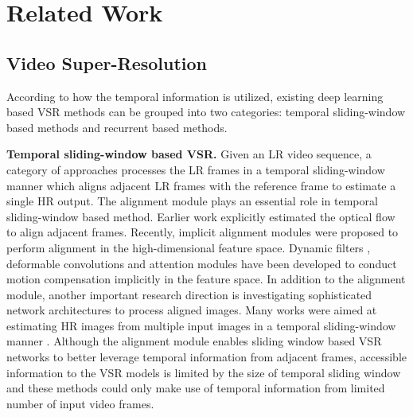\documentclass[10pt,twocolumn,letterpaper]{article}
\begin{document}
\section{Related Work}
\label{gen_inst}
\subsection{Video Super-Resolution}
According to how the temporal information is utilized, existing deep learning based VSR methods can be grouped into two categories: temporal sliding-window based methods and recurrent based methods.
%

\vspace{\baselineskip}
\noindent\textbf{Temporal sliding-window based VSR.}
Given an LR video sequence, a category of approaches processes the LR frames in a temporal sliding-window manner which aligns adjacent LR frames with the reference frame to estimate a single HR output.
%
The alignment module plays an essential role in temporal sliding-window based method.
%
Earlier work \cite{caballero2017real, liu2017robust, tao2017detail} explicitly estimated the optical flow to align adjacent frames.
%
Recently, implicit alignment modules \cite{xu2023implicit} were proposed to perform alignment in the high-dimensional feature space.
%
Dynamic filters \cite{jo2018deep}, deformable convolutions \cite{dai2017deformable, tian2020tdan, wang2019edvr} and attention modules \cite{Isobe_2020_CVPR, li2020mucan} have been developed to conduct motion compensation implicitly in the feature space.
%
In addition to the alignment module, another important research direction is investigating sophisticated network architectures to process aligned images.
%
Many works were aimed at estimating HR images from multiple input images in a temporal sliding-window manner \cite{li2020mucan, wang2019edvr, cao2021video, liang2022vrt}. 
%
%
Although the alignment module enables sliding window based VSR networks to better leverage temporal information from adjacent frames, accessible information to the VSR models is limited by the size of temporal sliding window and these methods could only make use of temporal information from limited number of input video frames.
\end{document}
